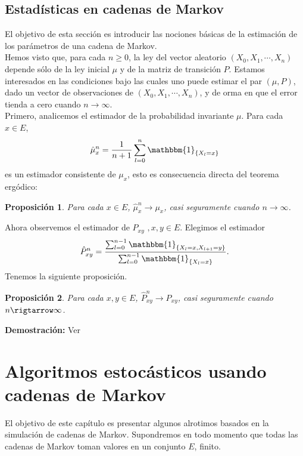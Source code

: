 \documentclass[a4paper]{article}
\newtheorem{prop}{Proposici\'on}
\numberwithin{equation}{subsection}
\begin{document}
\subsection{Estadísticas en cadenas de Markov}
El objetivo de esta sección es introducir las nociones básicas de la estimación de los parámetros de una cadena de Markov.\\
Hemos visto que, para cada $n\geq 0 $, la ley del vector aleatorio $(X_0,X_1,\cdots,X_n)$ depende sólo de la ley inicial $\mu$ y de la matriz de transición $P$. Estamos interesados en las condiciones bajo las cuales uno puede estimar el par $(\mu,P)$, dado un vector de observaciones de $(X_0,X_1,\cdots,X_n)$, y de orma en que el error tienda a cero cuando $n\rightarrow \infty$.\\
Primero, analicemos el estimador de la probabilidad invariante $\mu$. Para cada $x\in E$, 
\[\hat{\mu}_x^n = \frac{1}{n+1}\sum_{l=0}^n\mathbbm{1}_{\{X_l =x\}}\]
es un estimador consistente de $\mu_x$, esto es consecuencia directa del teorema ergódico:
\begin{prop}
Para cada $x\in E$, $\hat{\mu}_x^n \rightarrow \mu_x$, casi seguramente cuando $n\rightarrow \infty$.
\end{prop}

Ahora observemos el estimador de $P_{xy}$ $,x,y\in E$. Elegimos el estimador
\[\hat{P}_{xy}^n = \frac{\sum_{l=0}^{n-1}\mathbbm{1}_{\{X_l= x,X_{l+1}=y\}}}{\sum_{l=0}^{n-1}\mathbbm{1}_{\{X_l =x\}}}.\]
Tenemos la siguiente proposición.
\begin{prop}
Para cada $x,y\in E$, $\hat{P}_{xy}^n \rightarrow P_{xy}$, casi seguramente cuando $n\rigtarrow \infty$.
\end{prop}

\textbf{Demostración: }Ver \cite[Pag. 43]{Pard}\\ \newline

\section{Algoritmos estocásticos usando cadenas de Markov}
El objetivo de este capítulo es presentar algunos alrotimos basados en la simulación de cadenas de Markov. Supondremos en todo momento que todas las cadenas de Markov toman valores en un conjunto $E$, finito.
\end{document}
